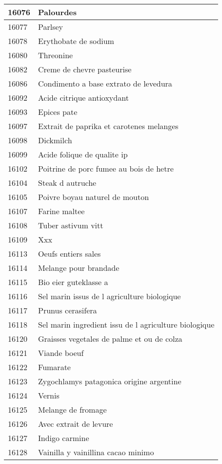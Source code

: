 \begin{longtable}{|l|l|}
16076 & Palourdes \\ \hline 
16077 & Parlsey \\ \hline 
16078 & Erythobate de sodium \\ \hline 
16080 & Threonine \\ \hline 
16082 & Creme de chevre pasteurise \\ \hline 
16086 & Condimento a base extrato de levedura \\ \hline 
16092 & Acide citrique antioxydant \\ \hline 
16093 & Epices pate \\ \hline 
16097 & Extrait de paprika et carotenes melanges \\ \hline 
16098 & Dickmilch \\ \hline 
16099 & Acide folique de qualite ip \\ \hline 
16102 & Poitrine de porc fumee au bois de hetre \\ \hline 
16104 & Steak d autruche \\ \hline 
16105 & Poivre boyau naturel de mouton \\ \hline 
16107 & Farine maltee \\ \hline 
16108 & Tuber astivum vitt \\ \hline 
16109 & Xxx \\ \hline 
16113 & Oeufs entiers sales \\ \hline 
16114 & Melange pour brandade \\ \hline 
16115 & Bio eier guteklasse a \\ \hline 
16116 & Sel marin  issus de l agriculture biologique \\ \hline 
16117 & Prunus cerasifera \\ \hline 
16118 & Sel marin ingredient issu de l agriculture biologique \\ \hline 
16120 & Graisses vegetales de palme et ou de colza \\ \hline 
16121 & Viande boeuf \\ \hline 
16122 & Fumarate \\ \hline 
16123 & Zygochlamys patagonica origine argentine \\ \hline 
16124 & Vernis \\ \hline 
16125 & Melange de fromage \\ \hline 
16126 & Avec extrait de levure \\ \hline 
16127 & Indigo carmine \\ \hline 
16128 & Vainilla y vainillina cacao minimo \\ \hline 

\end{longtable}

